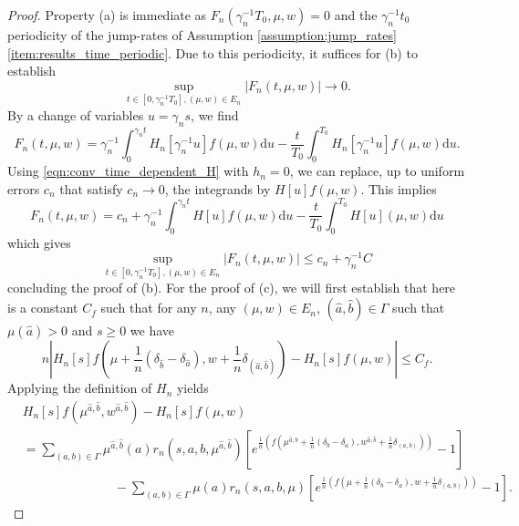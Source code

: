 \documentclass[a4paper]{article}
\newcommand{\dd}{ \mathrm{d}}
\numberwithin{equation}{section}
\theoremstyle{definition}
\begin{document}
\begin{proof}
	Property (a) is immediate as $F_n(\gamma_n^{-1} T_0,\mu,w) = 0$ and  the $\gamma_n^{-1}t_0$ periodicity of the jump-rates of Assumption \ref{assumption:jump_rates} \ref{item:results_time_periodic}. Due to this periodicity, it suffices for (b) to establish
	\begin{equation*}
		\sup_{t \in [0,\gamma_n^{-1}T_0], (\mu,w) \in E_n} |F_n(t,\mu,w) | \rightarrow 0.
	\end{equation*}
	By a change of variables $u = \gamma_n s$, we find
	\begin{equation*}
		F_n(t,\mu,w) = \gamma_n^{-1} \int_0^{\gamma_n t} H_n[\gamma_n^{-1} u] f (\mu,w) \dd u - \frac{t}{T_0} \int_0^{T_0} H_n[\gamma_n^{-1} u] f (\mu,w) \dd u.
	\end{equation*}
	Using \eqref{eqn:conv_time_dependent_H} with $h_n = 0$, we can replace, up to uniform errors $c_n$ that satisfy $c_n \rightarrow 0$, the integrands by $H[u]f(\mu,w)$. This implies
	\begin{equation*}
		F_n(t,\mu,w) = c_n + \gamma_n^{-1} \int_0^{\gamma_n t} H[u] f (\mu,w) \dd u - \frac{t}{T_0} \int_0^{T_0} H[u](\mu,w) \dd u
	\end{equation*}
	which gives
	\begin{equation*}
		\sup_{t \in [0,\gamma_n^{-1}T_0], (\mu,w) \in E_n} |F_n(t,\mu,w) | \leq c_n + \gamma_n^{-1} C
	\end{equation*}
	concluding the proof of (b). For the proof of (c), we will first establish that here is a constant $C_{f}$ such that for any $n$, any $(\mu,w) \in E_n$, $(\hat{a},\hat{b}) \in \Gamma$ such that $\mu(\hat{a}) > 0$  and $s \geq 0$ we have
	\begin{equation}\label{eqn:Lipschitz}
		n \left| H_n[s]f\left(\mu + \frac{1}{n}(\delta_{\hat{b}} - \delta_{\hat{a}}), w + \frac{1}{n} \delta_{(\hat{a},\hat{b})}\right) -  H_n[s]f(\mu,w) \right| \leq C_{f}.
	\end{equation}
	Applying the definition of $H_n$ yields
	\begin{align*}
		& H_n[s]f\left(\mu^{\hat{a},\hat{b}},w^{\hat{a},\hat{b}}\right) -  H_n[s]f(\mu,w) \\
		& = \sum_{(a,b)\in \Gamma} \mu^{\hat{a},\hat{b}}(a) r_n(s,a,b,\mu^{\hat{a},\hat{b}}) \left[ e^{\frac{1}{n}\left(f(\mu^{\hat{a},\hat{b}} + \frac{1}{n}( \delta_b - \delta_a) , w^{\hat{a},\hat{b}} + \frac{1}{n}\delta_{(a,b)}) \right)} - 1 \right] \\
		& \hspace{3cm} - \sum_{(a,b)\in \Gamma} \mu(a) r_n(s,a,b,\mu) \left[ e^{\frac{1}{n}\left(f(\mu + \frac{1}{n}( \delta_b - \delta_a), w + \frac{1}{n}\delta_{(a,b)}) \right)} - 1 \right].

\end{align*}
\end{proof}
\end{document}
